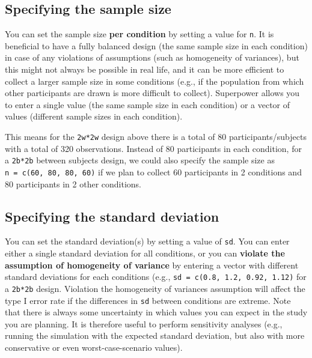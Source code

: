 \documentclass[
]{book}
\begin{document}
\hypertarget{specifying-the-sample-size}{%
\subsection{Specifying the sample size}\label{specifying-the-sample-size}}

You can set the sample size \textbf{per condition} by setting a value for \texttt{n}.
It is beneficial to have a fully balanced design (the same sample size in each condition) in case of any violations of assumptions (such as homogeneity of variances), but this might not always be possible in real life, and it can be more efficient to collect a larger sample size in some conditions (e.g., if the population from which other participants are drawn is more difficult to collect).
Superpower allows you to enter a single value (the same sample size in each condition) or a vector of values (different sample sizes in each condition).

This means for the \texttt{2w*2w} design above there is a total of 80 participants/subjects with a total of 320 observations.
Instead of 80 participants in each condition, for a \texttt{2b*2b} between subjects design, we could also specify the sample size as \texttt{n\ =\ c(60,\ 80,\ 80,\ 60)} if we plan to collect 60 participants in 2 conditions and 80 participants in 2 other conditions.

\hypertarget{specifying-the-standard-deviation}{%
\subsection{Specifying the standard deviation}\label{specifying-the-standard-deviation}}

You can set the standard deviation(s) by setting a value of \texttt{sd}.
You can enter either a single standard deviation for all conditions, or you can \textbf{violate the assumption of homogeneity of variance} by entering a vector with different standard deviations for each conditions (e.g., \texttt{sd\ =\ c(0.8,\ 1.2,\ 0.92,\ 1.12)} for a \texttt{2b*2b} design.
Violation the homogeneity of variances assumption will affect the type I error rate if the differences in \texttt{sd} between conditions are extreme.
Note that there is always some uncertainty in which values you can expect in the study you are planning.
It is therefore useful to perform sensitivity analyses (e.g., running the simulation with the expected standard deviation, but also with more conservative or even worst-case-scenario values).
\end{document}
